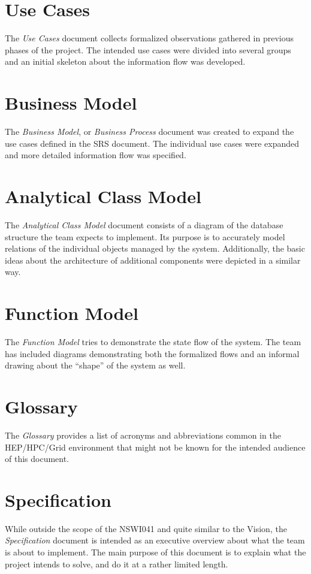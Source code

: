\documentclass[12pt]{article}
\begin{document}
\section{Use Cases}

The {\em Use Cases} document collects formalized observations gathered in previous phases of the project.  The intended use cases
were divided into several groups and an initial skeleton about the information flow was developed.

\section{Business Model}

The {\em Business Model}, or {\em Business Process} document was created to expand the use cases defined in the SRS document.  The
individual use cases were expanded and more detailed information flow was specified.

\section{Analytical Class Model}

The {\em Analytical Class Model} document consists of a diagram of the database structure the team expects to implement.  Its
purpose is to accurately model relations of the individual objects managed by the system.  Additionally, the basic ideas about the
architecture of additional components were depicted in a similar way.

\section{Function Model}

The {\em Function Model} tries to demonstrate the state flow of the system.  The team has included diagrams demonstrating both the
formalized flows and an informal drawing about the ``shape'' of the system as well.

\section{Glossary}

The {\em Glossary} provides a list of acronyms and abbreviations common in the HEP/HPC/Grid environment that might not be known
for the intended audience of this document.

\section{Specification}

While outside the scope of the NSWI041 and quite similar to the Vision, the {\em Specification} document is intended as an
executive overview about what the team is about to implement.  The main purpose of this document is to explain what the project
intends to solve, and do it at a rather limited length.
\end{document}
